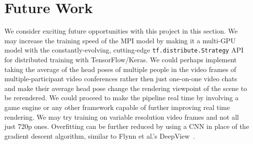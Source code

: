 \section{Future Work}\label{sec:future-work}

We consider exciting future opportunities with this project in this section. We may increase the training speed of the MPI model by making it a multi-GPU model with the constantly-evolving, cutting-edge \texttt{tf.distribute.Strategy} API for distributed training with TensorFlow/Keras. We could perhaps implement taking the average of the head poses of multiple people in the video frames of multiple-participant video conferences rather then just one-on-one video chats and make their average head pose change the rendering viewpoint of the scene to be rerendered. We could proceed to make the pipeline real time by involving a game engine or any other framework capable of further improving real time rendering. We may try training on variable resolution video frames and not all just 720p ones. Overfitting can be further reduced by using a CNN in place of the gradient descent algorithm, similar to Flynn et al.'s DeepView~\cite{flynn_deepview_2019}.










